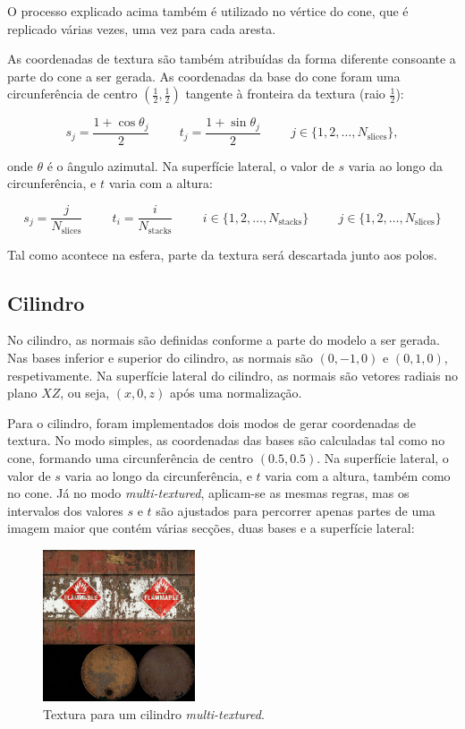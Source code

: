 \documentclass[12pt, a4paper]{article}
\begin{document}
O processo explicado acima também é utilizado no vértice do cone, que é replicado várias vezes, uma
vez para cada aresta.

As coordenadas de textura são também atribuídas da forma diferente consoante a parte do cone a ser
gerada. As coordenadas da base do cone foram uma circunferência de centro
$(\frac{1}{2}, \frac{1}{2})$ tangente à fronteira da textura (raio $\frac{1}{2}$):

$$
s_j = \frac{1 + \cos \theta_j}{2}
\hspace{1cm}
t_j = \frac{1 + \sin \theta_j}{2}
\hspace{1cm}
j \in \lbrace 1, 2, \ldots, N_\text{slices} \rbrace,
$$

onde $\theta$ é o ângulo azimutal. Na superfície lateral, o valor de $s$ varia ao longo da
circunferência, e $t$ varia com a altura:

$$
s_j = \frac{j}{N_\text{slices}}
\hspace{1cm}
t_i = \frac{i}{N_\text{stacks}}
\hspace{1cm}
i \in \lbrace 1, 2, \ldots, N_\text{stacks} \rbrace
\hspace{1cm}
j \in \lbrace 1, 2, \ldots, N_\text{slices} \rbrace
$$

Tal como acontece na esfera, parte da textura será descartada junto aos polos.

\subsection{Cilindro}

No cilindro, as normais são definidas conforme a parte do modelo a ser gerada. Nas bases inferior e
superior do cilindro, as normais são $(0, -1, 0)$ e $(0, 1, 0)$, respetivamente. Na superfície
lateral do cilindro, as normais são vetores radiais no plano $XZ$, ou seja, $(x, 0, z)$ após uma
normalização.

Para o cilindro, foram implementados dois modos de gerar coordenadas de textura. No modo simples, as
coordenadas das bases são calculadas tal como no cone, formando uma circunferência de centro
$(0.5, 0.5)$. Na superfície lateral, o valor de $s$ varia ao longo da circunferência, e $t$ varia
com a altura, também como no cone. Já no modo \emph{multi-textured}, aplicam-se as mesmas regras,
mas os intervalos dos valores $s$ e $t$ são ajustados para percorrer apenas partes de uma imagem
maior que contém várias secções, duas bases e a superfície lateral:

\begin{figure}[H]
    \centering
    \includegraphics[width=0.4\textwidth]{res/phase4/Barrel.jpg}
    \caption{Textura para um cilindro \emph{multi-textured}.}
\end{figure}
\end{document}
